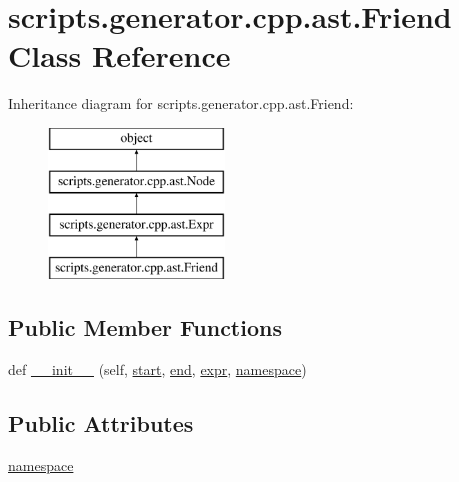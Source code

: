 \hypertarget{classscripts_1_1generator_1_1cpp_1_1ast_1_1_friend}{}\section{scripts.\+generator.\+cpp.\+ast.\+Friend Class Reference}
\label{classscripts_1_1generator_1_1cpp_1_1ast_1_1_friend}
Inheritance diagram for scripts.\+generator.\+cpp.\+ast.\+Friend\+:\begin{figure}[H]
\begin{center}
\leavevmode
\includegraphics[height=4.000000cm]{dc/dc0/classscripts_1_1generator_1_1cpp_1_1ast_1_1_friend}
\end{center}
\end{figure}
\subsection*{Public Member Functions}
\begin{DoxyCompactItemize}
\item 
def \mbox{\hyperlink{classscripts_1_1generator_1_1cpp_1_1ast_1_1_friend_a04a3eb07abc2c9888e7ba0d1b59c83a9}{\+\_\+\+\_\+init\+\_\+\+\_\+}} (self, \mbox{\hyperlink{classscripts_1_1generator_1_1cpp_1_1ast_1_1_node_a27ce0a583baee598b75ac6dd21f8575b}{start}}, \mbox{\hyperlink{classscripts_1_1generator_1_1cpp_1_1ast_1_1_node_a8e3394f9dd405352610ff9be4f284e2c}{end}}, \mbox{\hyperlink{classscripts_1_1generator_1_1cpp_1_1ast_1_1_expr_aa9a19b6b16005f4327b11e6247a9180a}{expr}}, \mbox{\hyperlink{classscripts_1_1generator_1_1cpp_1_1ast_1_1_friend_a6cd5edc58d322692694657c228256d26}{namespace}})
\end{DoxyCompactItemize}
\subsection*{Public Attributes}
\begin{DoxyCompactItemize}
\item 
\mbox{\hyperlink{classscripts_1_1generator_1_1cpp_1_1ast_1_1_friend_a6cd5edc58d322692694657c228256d26}{namespace}}
\end{DoxyCompactItemize}


